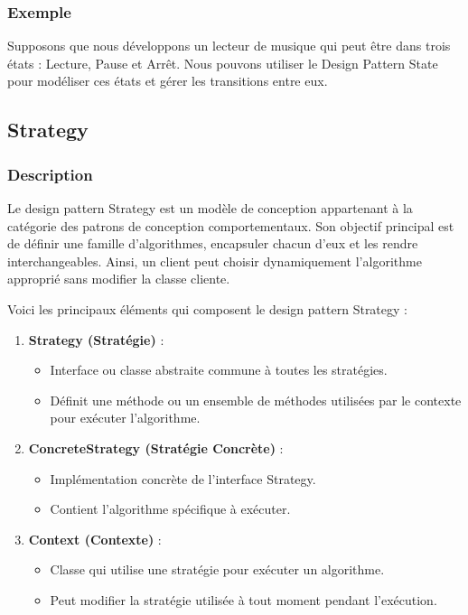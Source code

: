 \documentclass[french]{article}
\begin{document}
\subsubsection{Exemple}

Supposons que nous développons un lecteur de musique qui peut être dans trois états : Lecture, Pause et Arrêt. Nous pouvons utiliser le Design Pattern State pour modéliser ces états et gérer les transitions entre eux.





\newpage

\subsection{Strategy}

\subsubsection{Description}

Le design pattern Strategy est un modèle de conception appartenant à la catégorie des patrons de conception comportementaux. Son objectif principal est de définir une famille d'algorithmes, encapsuler chacun d'eux et les rendre interchangeables. Ainsi, un client peut choisir dynamiquement l'algorithme approprié sans modifier la classe cliente.

Voici les principaux éléments qui composent le design pattern Strategy :

\begin{enumerate}
    \item \textbf{Strategy (Stratégie)} :
    \begin{itemize}
        \item Interface ou classe abstraite commune à toutes les stratégies.
        \item Définit une méthode ou un ensemble de méthodes utilisées par le contexte pour exécuter l'algorithme.
    \end{itemize}
    
    \item \textbf{ConcreteStrategy (Stratégie Concrète)} :
    \begin{itemize}
        \item Implémentation concrète de l'interface Strategy.
        \item Contient l'algorithme spécifique à exécuter.
    \end{itemize}
    
    \item \textbf{Context (Contexte)} :
    \begin{itemize}
        \item Classe qui utilise une stratégie pour exécuter un algorithme.
        \item Peut modifier la stratégie utilisée à tout moment pendant l'exécution.
    \end{itemize}
\end{enumerate}
\end{document}
